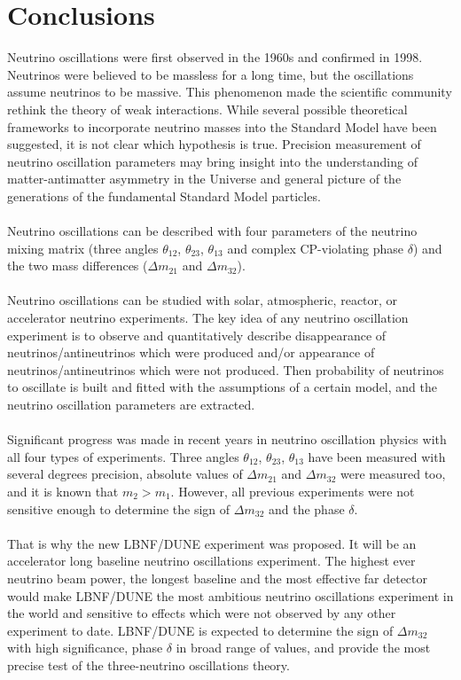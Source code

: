 \section{Conclusions}
Neutrino oscillations were first observed in the 1960s and confirmed in 1998. Neutrinos were believed to be massless for a long time, but the oscillations assume neutrinos to be massive. This phenomenon made the scientific community rethink the theory of weak interactions. While several possible theoretical frameworks to incorporate neutrino masses into the Standard Model have been suggested, it is not clear which hypothesis is true. Precision measurement of neutrino oscillation parameters may bring insight into the understanding of matter-antimatter asymmetry in the Universe and general picture of the generations of the fundamental Standard Model particles. \\ \\
Neutrino oscillations can be described with four parameters of the neutrino mixing matrix (three angles $\theta_{12}$, $\theta_{23}$, $\theta_{13}$ and complex CP-violating phase $\delta$) and the two mass differences (${\Delta}m_{21}$ and ${\Delta}m_{32}$).\\ \\
Neutrino oscillations can be studied with solar, atmospheric, reactor, or accelerator neutrino experiments. The key idea of any neutrino oscillation experiment is to observe and quantitatively describe disappearance of neutrinos/antineutrinos which were produced and/or appearance of neutrinos/antineutrinos which were not produced. Then probability of neutrinos to oscillate is built and fitted with the assumptions of a certain model, and the neutrino oscillation parameters are extracted.\\ \\
Significant progress was made in recent years in neutrino oscillation physics with all four types of experiments. Three angles $\theta_{12}$, $\theta_{23}$, $\theta_{13}$ have been measured with several degrees precision, absolute values of ${\Delta}m_{21}$ and ${\Delta}m_{32}$ were measured too, and it is known that $m_2 > m_1$. However, all previous experiments were not sensitive enough to determine the sign of ${\Delta}m_{32}$ and the phase $\delta$.\\ \\
That is why the new LBNF/DUNE experiment was proposed. It will be an accelerator long baseline neutrino oscillations experiment. The highest ever neutrino beam power, the longest baseline and the most effective far detector would make LBNF/DUNE the most ambitious neutrino oscillations experiment in the world and sensitive to effects which were not observed by any other experiment to date. LBNF/DUNE is expected to determine the sign of ${\Delta}m_{32}$ with high significance, phase $\delta$ in broad range of values, and provide the most precise test of the three-neutrino oscillations theory.\\ \\
